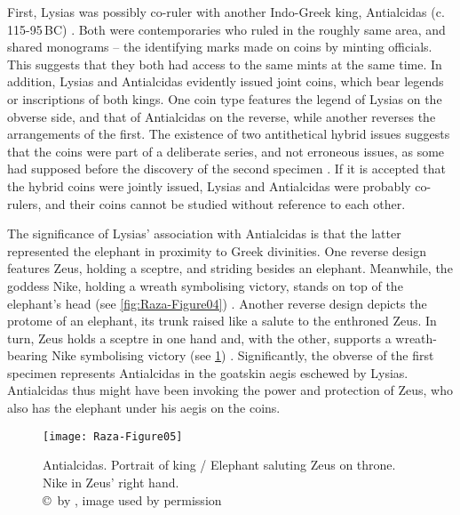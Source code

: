 \documentclass{ijsra}
\renewcommand\BC{{\,BC\xspace}}
\begin{document}
First, Lysias was possibly co-ruler with another Indo-Greek king, Antialcidas (c. 115-95\BC) \parencite[121]{Mairs2014}.
Both were contemporaries who ruled in the roughly same area, and shared monograms – the identifying marks made on coins by minting officials.
This suggests that they both had access to the same mints at the same time.
In addition, Lysias and Antialcidas evidently issued joint coins, which bear legends or inscriptions of both kings.
One coin type features the legend of Lysias on the obverse side, and that of Antialcidas on the reverse, while another reverses the arrangements of the first.
The existence of two antithetical hybrid issues suggests that the coins were part of a deliberate series, and not erroneous issues, as some had supposed before the discovery of the second specimen \parencites[1184]{Bopearachchi2015}[154]{Narain2003}.
If it is accepted that the hybrid coins were jointly issued, Lysias and Antialcidas were probably co-rulers, and their coins cannot be studied without reference to each other.

The significance of Lysias’ association with Antialcidas is that the latter represented the elephant in proximity to Greek divinities.
One reverse design features Zeus, holding a sceptre, and striding besides an elephant. Meanwhile, the goddess Nike, holding a wreath symbolising victory, stands on top of the elephant’s head (see \cref{fig:Raza-Figure04}) \parencite[27]{Narain1991}.
Another reverse design depicts the protome of an elephant, its trunk raised like a salute to the enthroned Zeus.
In turn, Zeus holds a sceptre in one hand and, with the other, supports a wreath-bearing Nike symbolising victory (see \cref{fig:Raza-Figure05}) \parencite[33--34]{Whitehead1970}.
Significantly, the obverse of the first specimen represents Antialcidas in the goatskin aegis eschewed by Lysias.
Antialcidas thus might have been invoking the power and protection of Zeus, who also has the elephant under his aegis on the coins. 

\begin{figure}[!htb] %
	\centering
	\texttt{[image: Raza-Figure05]}
	\caption{Antialcidas. Portrait of king / Elephant saluting Zeus on throne. Nike in Zeus’ right hand.
		{\normalfont\scriptsize \\ \copyright\ by \cite{Coin}, image used by permission}}
	\label{fig:Raza-Figure05}
\end{figure}
\end{document}
